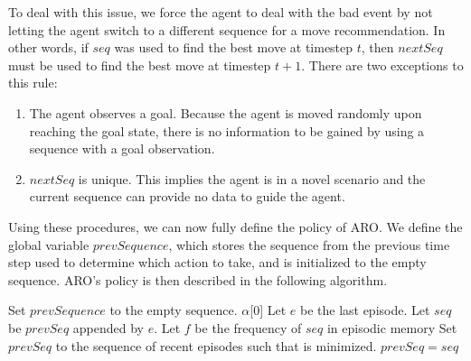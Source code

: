 \documentclass[letterpaper]{article} %
\begin{document}
To deal with this issue, we force the agent to deal with the bad event by not letting the agent switch to a different sequence for a move recommendation. In other words, if $seq$ was used to find  the best move at timestep $t$, then $nextSeq$ must be used to find the best move at timestep $t+1$. There are two exceptions to this rule:
\begin{enumerate}
	\item The agent observes a goal. Because the agent is moved randomly upon reaching the goal state, there is no information to be gained by using a sequence with a goal observation.
	\item $nextSeq$ is unique. This implies the agent is in a novel scenario and the current sequence can provide no data to guide the agent.
\end{enumerate}

Using these procedures, we can now fully define the policy of ARO. We define the global variable $prevSequence$, which stores the sequence from the previous time step used to determine which action to take, and is initialized to the empty sequence. ARO's policy is then described in the following algorithm.

\begin{algorithmic}
			\State Set $prevSequence$ to the empty sequence.
			\State \Return $\alpha$[0]
		\EndIf
		\State Let $e$ be the last episode.
		\State Let $seq$ be $prevSeq$ appended by $e$.
		\State Let $f$ be the frequency of $seq$ in episodic memory
			\State Set $prevSeq$ to the sequence of recent episodes such that  is minimized.
			\State \Return {}
		\Else
			\State $prevSeq = seq$
			\State \Return {}
		\EndIf
		
	\EndFunction
	
\end{algorithmic}

\end{document}
